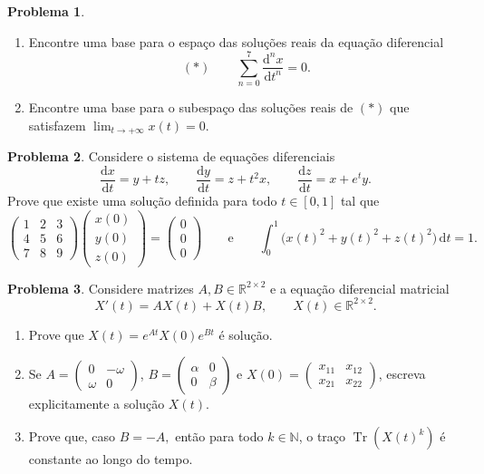 \documentclass[10pt,a4paper]{amsart}
\newcommand{\R}{\mathbb{R}}
\renewcommand{\d}{\mathrm{d}}
\theoremstyle{definition}
\newtheorem{problema}{Problema}
\begin{document}
\begin{problema}
\begin{enumerate}[label=(\alph*)]
    \item Encontre uma base para o espaço das soluções reais da equação
    diferencial
    \[
        (*)\qquad \sum_{n=0}^{7}\frac{\d^n x}{\d t^n}=0.
    \]
    \item Encontre uma base para o subespaço das soluções reais de $(*)$ que
    satisfazem $\lim_{t\to+\infty}x(t)=0$.
\end{enumerate}
\end{problema}

\begin{problema}
Considere o sistema de equações diferenciais
\[
    \frac{\d x}{\d t}=y+tz,\qquad
    \frac{\d y}{\d t}=z+t^2x,\qquad
    \frac{\d z}{\d t}=x+e^ty.
\]
Prove que existe uma solução definida para todo $t\in[0,1]$ tal que
\[
    \begin{pmatrix}1&2&3\\4&5&6\\7&8&9\end{pmatrix}
    \begin{pmatrix}x(0)\\y(0)\\z(0)\end{pmatrix}
    =\begin{pmatrix}0\\0\\0\end{pmatrix}
    \qquad\text{e}\qquad
    \int_0^1\bigl(x(t)^2+y(t)^2+z(t)^2\bigr)\,\d t=1.
\]
\end{problema}

\begin{problema}
Considere matrizes $A,B\in\R^{2\times2}$ e a equação diferencial matricial
\[
    X'(t)=AX(t)+X(t)B,\qquad X(t)\in\R^{2\times2}.
\]
\begin{enumerate}[label=(\alph*)]
    \item Prove que $X(t)=e^{At}X(0)e^{Bt}$ é solução.
    \item Se
    $A=\begin{pmatrix}0&-\omega\\\omega&0\end{pmatrix}$,
    $B=\begin{pmatrix}\alpha&0\\0&\beta\end{pmatrix}$ e
    $X(0)=\begin{pmatrix}x_{11}&x_{12}\\x_{21}&x_{22}\end{pmatrix}$,
    escreva explicitamente a solução $X(t)$.
    \item Prove que, caso $B = - A,$ então para todo $k\in\mathbb{N}$, o traço
    $\operatorname{Tr}(X(t)^k)$ é constante ao longo do tempo.
\end{enumerate}
\end{problema}
\end{document}
